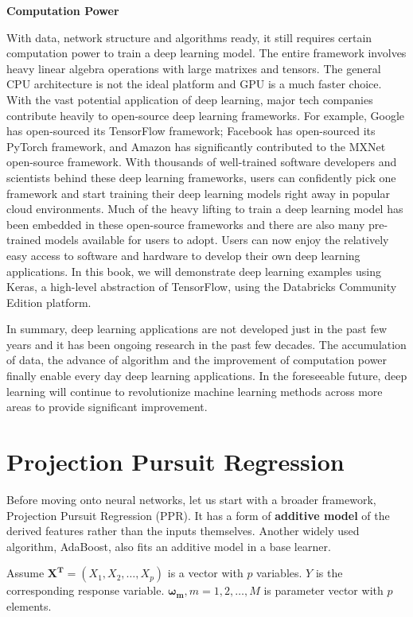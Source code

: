 \documentclass[12pt,]{krantz}
\begin{document}
\textbf{Computation Power}

With data, network structure and algorithms ready, it still requires certain computation power to train a deep learning model. The entire framework involves heavy linear algebra operations with large matrixes and tensors. The general CPU architecture is not the ideal platform and GPU is a much faster choice. With the vast potential application of deep learning, major tech companies contribute heavily to open-source deep learning frameworks. For example, Google has open-sourced its TensorFlow framework; Facebook has open-sourced its PyTorch framework, and Amazon has significantly contributed to the MXNet open-source framework. With thousands of well-trained software developers and scientists behind these deep learning frameworks, users can confidently pick one framework and start training their deep learning models right away in popular cloud environments. Much of the heavy lifting to train a deep learning model has been embedded in these open-source frameworks and there are also many pre-trained models available for users to adopt. Users can now enjoy the relatively easy access to software and hardware to develop their own deep learning applications. In this book, we will demonstrate deep learning examples using Keras, a high-level abstraction of TensorFlow, using the Databricks Community Edition platform.

In summary, deep learning applications are not developed just in the past few years and it has been ongoing research in the past few decades. The accumulation of data, the advance of algorithm and the improvement of computation power finally enable every day deep learning applications. In the foreseeable future, deep learning will continue to revolutionize machine learning methods across more areas to provide significant improvement.

\hypertarget{projection-pursuit-regression}{%
\section{Projection Pursuit Regression}\label{projection-pursuit-regression}}

Before moving onto neural networks, let us start with a broader framework, Projection Pursuit Regression (PPR). It has a form of \textbf{additive model} of the derived features rather than the inputs themselves. Another widely used algorithm, AdaBoost, also fits an additive model in a base learner.

Assume \(\mathbf{X^{T}}=(X_1,X_2,\dots,X_p)\) is a vector with \(p\) variables. \(Y\) is the corresponding response variable. \(\mathbf{\omega_{m}},m=1,2,\dots,M\) is parameter vector with \(p\) elements.
\end{document}
